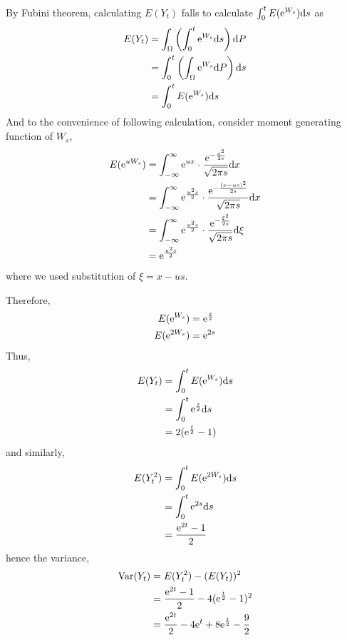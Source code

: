 \documentclass{homework}
\DeclareMathOperator{\var}{Var}
\begin{document}
    \problem
    By Fubini theorem, calculating $E(Y_t)$ falls to
    calculate $\int_0^tE(\mathrm e^{W_s})\mathrm d s$ as
    \[\begin{aligned}
    E(Y_t)&=\int_\Omega\left(\int_0^t\mathrm e^{W_s}\mathrm d s\right)\mathrm d P\\
    &=\int_0^t\left(\int_\Omega\mathrm e^{W_s}\mathrm d P\right)\mathrm d s\\
    &=\int_0^tE(\mathrm e^{W_s})\mathrm d s \\
    \end{aligned}\]
    And to the convenience of following calculation, consider moment
    generating function of $W_s$,
    \begin{equation}
        \label{eq:mgf}
        \begin{aligned}
        E(\mathrm e^{uW_s})&=\int_{-\infty}^\infty\mathrm e^{ux}\cdot
        \frac{\mathrm e^{-\frac{x^2}{2s}}}{\sqrt{2\pi s}}\mathrm d x\\
        &=\int_{-\infty}^\infty\mathrm e^{\frac{u^2s}{2}}
        \cdot\frac{\mathrm e^{-\frac{(x-us)^2}{2s}}}{\sqrt{2\pi s}}\mathrm d x\\
        &=\int_{-\infty}^\infty\mathrm e^{\frac{u^2s}{2}}
        \cdot\frac{\mathrm e^{-\frac{\xi^2}{2s}}}{\sqrt{2\pi s}}\mathrm d\xi\\
        &=\mathrm e^{\frac{u^2s}{2}}
        \end{aligned}
    \end{equation}
    where we used substitution of $\xi=x-us$.

    Therefore,
    \[\begin{aligned}
        E(\mathrm e^{W_s})&=\mathrm e^{\frac{s}{2}}\\
        E(\mathrm e^{2W_s})&=\mathrm e^{2s}\\
    \end{aligned}\]
    Thus,
    \[\begin{aligned}
        E(Y_t)&=\int_0^tE(\mathrm e^{W_s})\mathrm d s\\
        &=\int_0^t\mathrm e^{\frac{s}{2}}\mathrm d s\\
        &=2(\mathrm e^{\frac{t}{2}}-1)
    \end{aligned}\]
    and similarly,
    \[\begin{aligned}
        E(Y_t^2)&=\int_0^tE(\mathrm e^{2W_s})\mathrm d s\\
        &=\int_0^t\mathrm e^{2s}\mathrm d s\\
        &=\frac{\mathrm e^{2t}-1}{2}
    \end{aligned}\]
    hence the variance,
    \[\begin{aligned}
        \var(Y_t)&=E(Y_t^2)-(E(Y_t))^2\\
        &=\frac{\e^{2t}-1}{2}-4(\e^{\frac{t}{2}}-1)^2\\
        &=\frac{\e^{2t}}{2}-4\e^t+8\e^{\frac{t}{2}}-\frac{9}{2}
    \end{aligned}\]
\end{document}
